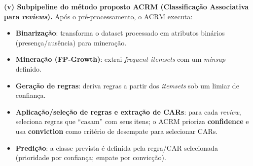 \textbf{(v) Subpipeline do método proposto ACRM (Classificação Associativa para \textit{reviews}).}
Após o pré-processamento, o ACRM executa:
\begin{itemize}
  \item \textbf{Binarização}: transforma o dataset processado em atributos binários (presença/ausência) para mineração.
  \item \textbf{Mineração (FP-Growth)}: extrai \textit{frequent itemsets} com um \textit{minsup} definido.
  \item \textbf{Geração de regras}: deriva regras a partir dos \textit{itemsets} sob um limiar de confiança.
  \item \textbf{Aplicação/seleção de regras e extração de CARs}: para cada \textit{review}, seleciona regras que “casam” com seus itens; o ACRM prioriza \textbf{confidence} e usa \textbf{conviction} como critério de desempate para selecionar CARs.
  \item \textbf{Predição}: a classe prevista é definida pela regra/CAR selecionada (prioridade por confiança; empate por convicção).
\end{itemize}



